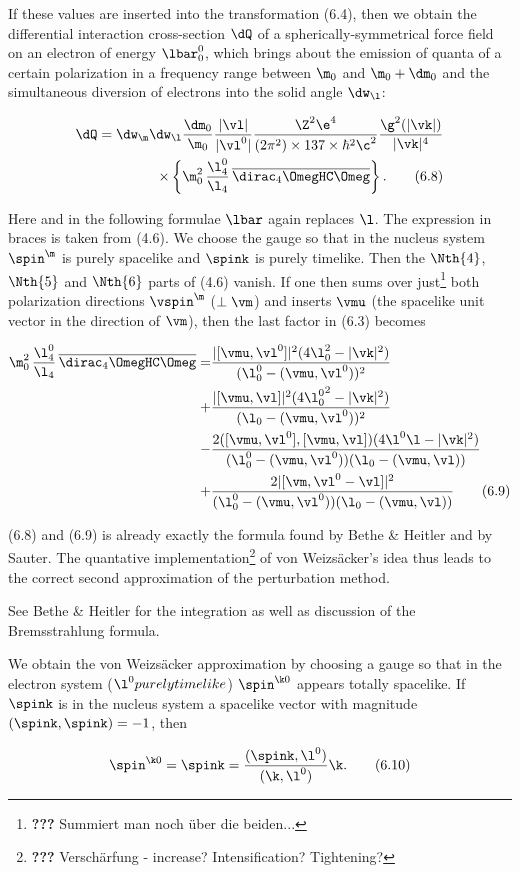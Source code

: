 \documentclass{article}
\newcommand{\WTF}[1]{\footnote{\textbf{???} #1}}
\newcommand{\nequ}[2]{
\begin{align*}
#1
\tag{#2}
\end{align*}
}
\newcommand{\barred}[1]{
\overline{#1}
}
\begin{document}
If these values are inserted into the transformation (6.4), then we obtain the differential interaction cross-section $\dQ$ of a spherically-symmetrical force field on an electron of energy $\lbar^0_0$, which brings about the emission of quanta of a certain polarization in a frequency range between $\m_0$ and $\m_0+\dm_0$ and the simultaneous diversion of electrons into the solid angle $\dw_\l$:
\nequ{
\dQ = \dw_\m\dw_\l\frac{\dm_0}{\m_0}\frac{|\vl|}{|\vl^0|}
      \frac{\Z^2\e^4}{(2\pi^2)\times 137\times\hbar^2\c^2}
      \frac{\g^2(|\vk|)}{|\vk|^4} \\
      \times\left\{
      \m_{0}^2 \,\frac{\l^0_4}{\l_{4}}\,\barred{\dirac_4\OmegHC\Omeg}
      \right\}.
}{6.8}
Here and in the following formulae $\lbar$ again replaces $\l$. The expression in braces is taken from (4.6). We choose the gauge so that in the nucleus system $\spin^\m$ is purely spacelike and $\spink$ is purely timelike. Then the $\Nth{4}$, $\Nth{5}$ and $\Nth{6}$ parts of (4.6) vanish. If one then sums over just\WTF{Summiert man noch über die beiden...} both polarization directions $\vspin^\m$ ($\perp \vm$) and inserts $\vmu$ (the spacelike unit vector in the direction of $\vm$), then the last factor in (6.3) becomes
\nequ{
\m_0^2\,\frac{\l_4^0}{\l_4}\,\barred{\dirac_4\OmegHC\Omeg} = 
 & \frac{|\lbrack \vmu,\vl^0 \rbrack|^2(4\l_0^2 - |\vk|^2)}{(\l^0_0 - (\vmu,\vl^0))^2}\\
+& \frac{|\lbrack \vmu,\vl \rbrack|^2(4{\l^0_0}^2 - |\vk|^2)}{(\l_0 - (\vmu,\vl^0))^2}\\
-& \frac{2(\lbrack \vmu,\vl^0 \rbrack, \lbrack \vmu, \vl \rbrack)
          (4\l^0\l - |\vk|^2)}
        {(\l^0_0 - (\vmu,\vl^0))(\l_0 - (\vmu,\vl))}\\
+& \frac{2|\lbrack \vm, \vl^0-\vl \rbrack|^2}
        {(\l^0_0 - (\vmu,\vl^0))(\l_0 - (\vmu,\vl))}
}{6.9}

(6.8) and (6.9) is already exactly the formula found by Bethe \& Heitler and by Sauter\cite{2}. The quantative implementation\WTF{Verschärfung - increase? Intensification? Tightening?} of von Weizsäcker's idea thus leads to the correct second approximation of the perturbation method.

See Bethe \& Heitler\cite{2} for the integration as well as discussion of the Bremsstrahlung formula.

We obtain the von Weizsäcker approximation by choosing a gauge so that in the electron system ($\l^0 purely timelike$) $\spin^{\k 0}$ appears totally spacelike. If $\spink$ is in the nucleus system a spacelike vector with magnitude $(\spink,\spink)=-1$, then
\nequ{
\spin^{\k 0} = \spink = \frac{(\spink,\l^0)}{(\k,\l^0)}\k.
}{6.10}
\end{document}
